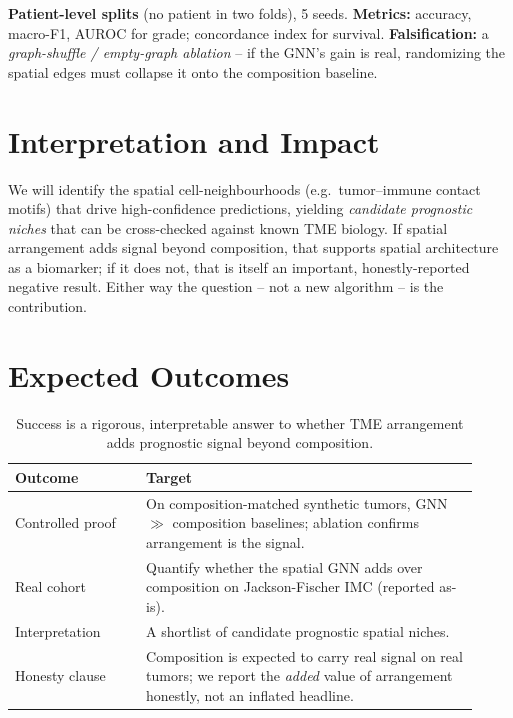 \documentclass[11pt]{article}
\begin{document}
\noindent\textbf{Patient-level splits} (no patient in two folds), 5 seeds.
\textbf{Metrics:} accuracy, macro-F1, AUROC for grade; concordance index for
survival. \textbf{Falsification:} a \emph{graph-shuffle / empty-graph ablation}
-- if the GNN's gain is real, randomizing the spatial edges must collapse it onto
the composition baseline.

\section{Interpretation and Impact}

We will identify the spatial cell-neighbourhoods (e.g.\ tumor--immune contact
motifs) that drive high-confidence predictions, yielding \emph{candidate
prognostic niches} that can be cross-checked against known TME biology. If
spatial arrangement adds signal beyond composition, that supports spatial
architecture as a biomarker; if it does not, that is itself an important,
honestly-reported negative result. Either way the question -- not a new
algorithm -- is the contribution.

\section{Expected Outcomes}

\begin{table}[h]
\centering\small
\begin{tabular}{>{\raggedright\arraybackslash}p{0.26\linewidth} >{\raggedright\arraybackslash}p{0.66\linewidth}}
\toprule
\rowcolor{sriblue}\color{white}\textbf{Outcome} & \color{white}\textbf{Target}\\
\midrule
\rowcolor{srirow} Controlled proof & On composition-matched synthetic tumors, GNN $\gg$ composition baselines; ablation confirms arrangement is the signal.\\
Real cohort & Quantify whether the spatial GNN adds over composition on Jackson-Fischer IMC (reported as-is).\\
\rowcolor{srirow} Interpretation & A shortlist of candidate prognostic spatial niches.\\
Honesty clause & Composition is expected to carry real signal on real tumors; we report the \emph{added} value of arrangement honestly, not an inflated headline.\\
\bottomrule
\end{tabular}
\caption{Success is a rigorous, interpretable answer to whether TME arrangement
adds prognostic signal beyond composition.}
\label{tab:success}
\end{table}
\end{document}
